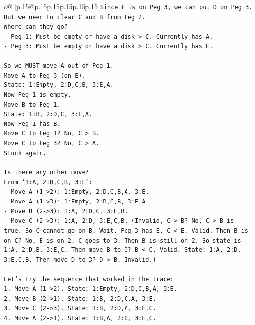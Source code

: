 \documentclass{article}
\begin{document}
{\begin{supertabular}{c@{$\;$}|p{.15\linewidth}@{}p{.15\linewidth}p{.15\linewidth}p{.15\linewidth}p{.15\linewidth}p{.15\linewidth}}
{{{\texttt{Since E is on Peg 3, we can put D on Peg 3.} \\
\texttt{But we need to clear C and B from Peg 2.} \\
\texttt{Where can they go?} \\
\texttt{{-} Peg 1: Must be empty or have a disk > C. Currently has A.} \\
\texttt{{-} Peg 3: Must be empty or have a disk > C. Currently has E.} \\
\\ 
\texttt{So we MUST move A out of Peg 1.} \\
\texttt{Move A to Peg 3 (on E).} \\
\texttt{State: 1:Empty, 2:D,C,B, 3:E,A.} \\
\texttt{Now Peg 1 is empty.} \\
\texttt{Move B to Peg 1.} \\
\texttt{State: 1:B, 2:D,C, 3:E,A.} \\
\texttt{Now Peg 1 has B.} \\
\texttt{Move C to Peg 1? No, C > B.} \\
\texttt{Move C to Peg 3? No, C > A.} \\
\texttt{Stuck again.} \\
\\ 
\texttt{Is there any other move?} \\
\texttt{From `1:A, 2:D,C,B, 3:E`:} \\
\texttt{{-} Move A (1{-}>2): 1:Empty, 2:D,C,B,A, 3:E.} \\
\texttt{{-} Move A (1{-}>3): 1:Empty, 2:D,C,B, 3:E,A.} \\
\texttt{{-} Move B (2{-}>3): 1:A, 2:D,C, 3:E,B.} \\
\texttt{{-} Move C (2{-}>3): 1:A, 2:D, 3:E,C,B. (Invalid, C > B? No, C > B is true. So C cannot go on B. Wait. Peg 3 has E. C < E. Valid. Then B is on C? No, B is on 2. C goes to 3. Then B is still on 2. So state is 1:A, 2:D,B, 3:E,C. Then move B to 3? B < C. Valid. State: 1:A, 2:D, 3:E,C,B. Then move D to 3? D > B. Invalid.)} \\
\\ 
\texttt{Let's try the sequence that worked in the trace:} \\
\texttt{1. Move A (1{-}>2). State: 1:Empty, 2:D,C,B,A, 3:E.} \\
\texttt{2. Move B (2{-}>1). State: 1:B, 2:D,C,A, 3:E.} \\
\texttt{3. Move C (2{-}>3). State: 1:B, 2:D,A, 3:E,C.} \\
\texttt{4. Move A (2{-}>1). State: 1:B,A, 2:D, 3:E,C.} \\
}}}
\end{supertabular}}
\end{document}
